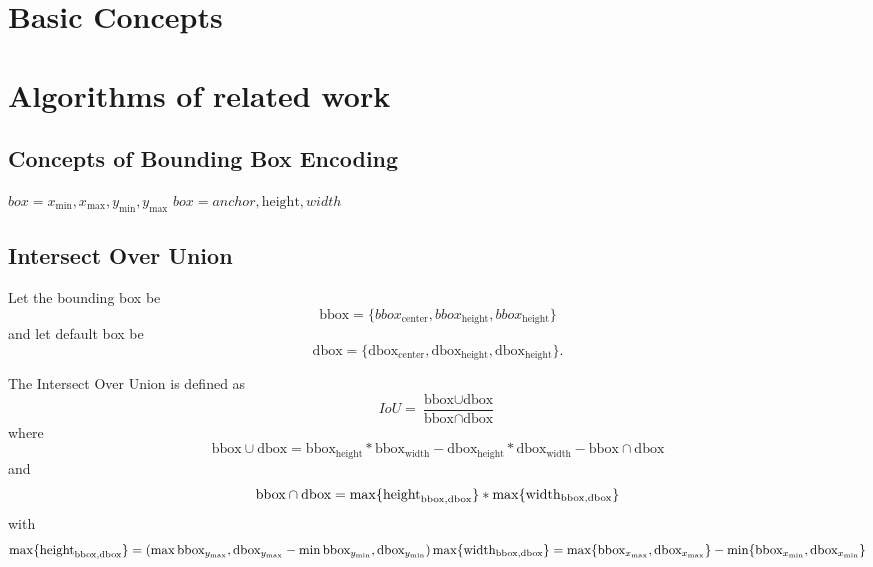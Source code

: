 \chapter{Basic Concepts}
\blindtext[1]

\chapter{Algorithms of related work}
\blindtext[2]

\section{Concepts of Bounding Box Encoding}\label{append:Concepts of Bounding Box Encoding}
\(box = {x_{\text{min}}, x_{\text{max}}, y_{\text{min}}, y_{\text{max}}}\)
\(box = {anchor, \text{height}, width}\)
\blindtext[1]

\section{Intersect Over Union}\label{sect:Intersect Over Union}
Let the bounding box be 
\begin{equation}
    \text{bbox}=\{bbox_\text{center}, bbox_{\text{height}}, bbox_\text{height}\}
\end{equation}
and let default box be 
\begin{equation}
    \text{dbox}=\{\text{dbox}_\text{center}, \text{dbox}_\text{height}, \text{dbox}_\text{height}\}.
\end{equation}

The Intersect Over Union is defined as
\begin{equation}
    IoU=\frac{\text{bbox}\cup \text{dbox}}{\text{bbox}\cap \text{dbox}}
\end{equation}
where
\begin{equation}
    \text{bbox}\cup \text{dbox}=\text{bbox}_{\text{height}}*\text{bbox}_{\text{width}} - \text{dbox}_{\text{height}}*\text{dbox}_{\text{width}} - \text{bbox}\cap \text{dbox}
\end{equation}
and
\begin{equation}
   \text{bbox}\cap \text{dbox} = \max\{\text{height}_{\text{bbox}, \text{dbox}}\}*\max\{\text{width}_{\text{bbox}, \text{dbox}}\}\\
\end{equation}
with
\begin{equation}
    \max\{\text{height}_{\text{bbox}, \text{dbox}}\} = (\max{\text{bbox}_{y_\text{max}}, \text{dbox}_{y_\text{max}}}-\min{\text{bbox}_{y_\text{min}}, \text{dbox}_{y_\text{min}}})\\
    \max\{\text{width}_{\text{bbox}, \text{dbox}}\}= \max\{\text{bbox}_{x_\text{max}}, \text{dbox}_{x_\text{max}}\}-\min\{\text{bbox}_{x_\text{min}}, \text{dbox}_{x_\text{min}}\}
\end{equation}


